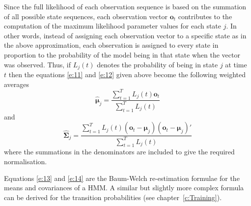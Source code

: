 Since the full likelihood of each observation sequence
is based on the summation of all possible state sequences,
each observation vector $\bm{o}_t$ contributes to the computation
of the maximum likelihood parameter values for each state $j$.
In other words, instead of assigning each observation vector
to a specific state as in the above approximation, each
observation is assigned to every state in proportion to
the probability of the model being in that state when the
vector was observed.  Thus, if $L_j(t)$ denotes the probability
of being in state $j$ at time $t$ then the 
equations \ref{e:11} and \ref{e:12} given above become the
following weighted averages
\begin{equation} \label{e:13}
   \hat{\bm{\mu}}_j = \frac{ \sum_{t=1}^{T} L_j(t) \bm{o}_t}
                          {\sum_{t=1}^{T} L_j(t)}
\end{equation}
and
\begin{equation} \label{e:14}
   \hat{\bm{\Sigma}}_j = \frac{ \sum_{t=1}^{T} L_j(t)
        (\bm{o}_t - \bm{\mu}_j) (\bm{o}_t - \bm{\mu}_j)' }
                      {\sum_{t=1}^{T} L_j(t)}
\end{equation}
where the summations in the denominators are included to give
the required normalisation.

Equations \ref{e:13} and \ref{e:14} are the 
Baum-Welch re-estimation
formulae for the means and covariances of a HMM.  A similar but
slightly more complex formula can be derived for the transition
probabilities (see chapter~\ref{c:Training}).

